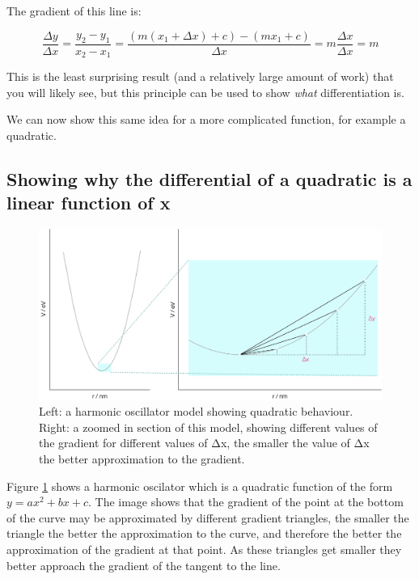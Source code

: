 \documentclass[
]{book}
\begin{document}
The gradient of this line is:

\begin{equation*}
 \frac{\Delta y}{\Delta x} = \frac{y_2-y_1}{x_2-x_1}=\frac{(m(x_1+ \Delta x) + c) - (mx_1 + c)}{\Delta x} = m\frac{\Delta x}{\Delta x}=m
\end{equation*}

This is the least surprising result (and a relatively large amount of work) that you will likely see, but this principle can be used to show \emph{what} differentiation is.

We can now show this same idea for a more complicated function, for example a quadratic.

\hypertarget{showing-why-the-differential-of-a-quadratic-is-a-linear-function-of-x}{%
\subsection{Showing why the differential of a quadratic is a linear function of x}\label{showing-why-the-differential-of-a-quadratic-is-a-linear-function-of-x}}

\begin{figure}

{\centering \includegraphics[width=0.8\linewidth]{images/quadratic} 

}

\caption{Left: a harmonic oscillator model showing quadratic behaviour. Right: a zoomed in section of this model, showing different values of the gradient for different values of Δx, the smaller the value of Δx the better approximation to the gradient.}\label{fig:quad}
\end{figure}

Figure \ref{fig:quad} shows a harmonic oscilator which is a quadratic function of the form \(y=ax^2+bx+c\). The image shows that the gradient of the point at the bottom of the curve may be approximated by different gradient triangles, the smaller the triangle the better the approximation to the curve, and therefore the better the approximation of the gradient at that point. As these triangles get smaller they better approach the gradient of the tangent to the line.
\end{document}
